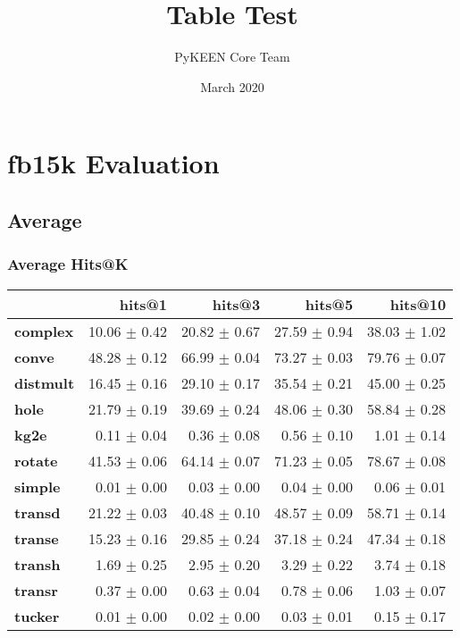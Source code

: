 \documentclass{article}
\title{Table Test}
\author{PyKEEN Core Team}
\date{March 2020}
\begin{document}
\section{fb15k Evaluation}
    \subsection{Average}
    \subsubsection{Average Hits@K}
    \begin{center}
    \begin{tabular}{lrrrr}
\toprule
{} &        hits@1 &        hits@3 &        hits@5 &       hits@10 \\
\midrule
\textbf{complex } &  10.06 $\pm$ 0.42 &  20.82 $\pm$ 0.67 &  27.59 $\pm$ 0.94 &  38.03 $\pm$ 1.02 \\
\textbf{conve   } &  48.28 $\pm$ 0.12 &  66.99 $\pm$ 0.04 &  73.27 $\pm$ 0.03 &  79.76 $\pm$ 0.07 \\
\textbf{distmult} &  16.45 $\pm$ 0.16 &  29.10 $\pm$ 0.17 &  35.54 $\pm$ 0.21 &  45.00 $\pm$ 0.25 \\
\textbf{hole    } &  21.79 $\pm$ 0.19 &  39.69 $\pm$ 0.24 &  48.06 $\pm$ 0.30 &  58.84 $\pm$ 0.28 \\
\textbf{kg2e    } &   0.11 $\pm$ 0.04 &   0.36 $\pm$ 0.08 &   0.56 $\pm$ 0.10 &   1.01 $\pm$ 0.14 \\
\textbf{rotate  } &  41.53 $\pm$ 0.06 &  64.14 $\pm$ 0.07 &  71.23 $\pm$ 0.05 &  78.67 $\pm$ 0.08 \\
\textbf{simple  } &   0.01 $\pm$ 0.00 &   0.03 $\pm$ 0.00 &   0.04 $\pm$ 0.00 &   0.06 $\pm$ 0.01 \\
\textbf{transd  } &  21.22 $\pm$ 0.03 &  40.48 $\pm$ 0.10 &  48.57 $\pm$ 0.09 &  58.71 $\pm$ 0.14 \\
\textbf{transe  } &  15.23 $\pm$ 0.16 &  29.85 $\pm$ 0.24 &  37.18 $\pm$ 0.24 &  47.34 $\pm$ 0.18 \\
\textbf{transh  } &   1.69 $\pm$ 0.25 &   2.95 $\pm$ 0.20 &   3.29 $\pm$ 0.22 &   3.74 $\pm$ 0.18 \\
\textbf{transr  } &   0.37 $\pm$ 0.00 &   0.63 $\pm$ 0.04 &   0.78 $\pm$ 0.06 &   1.03 $\pm$ 0.07 \\
\textbf{tucker  } &   0.01 $\pm$ 0.00 &   0.02 $\pm$ 0.00 &   0.03 $\pm$ 0.01 &   0.15 $\pm$ 0.17 \\
\bottomrule
\end{tabular}

    \end{center}
\end{document}
